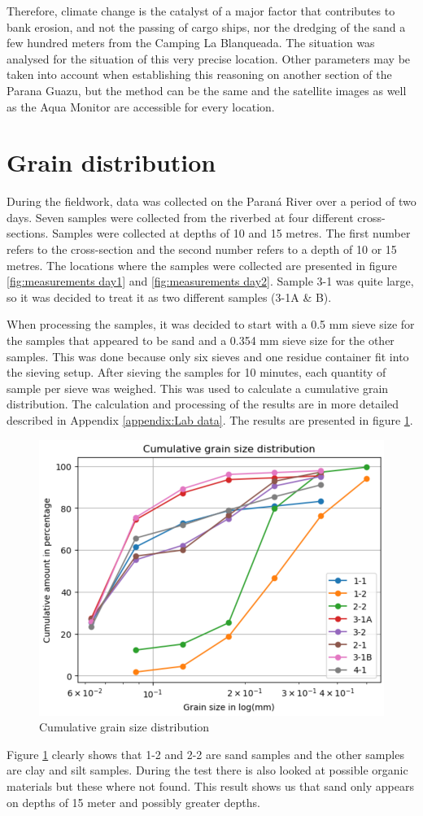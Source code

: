 Therefore, climate change is the catalyst of a major factor that contributes to bank erosion, and not the passing of cargo ships, nor the dredging of the sand a few hundred meters from the Camping La Blanqueada.
The situation was analysed for the situation of this very precise location. Other parameters may be taken into account when establishing this reasoning on another section of the Parana Guazu, but the method can be the same and the satellite images as well as the Aqua Monitor are accessible for every location. 

\section{Grain distribution}
During the fieldwork, data was collected on the Paraná River over a period of two days. Seven samples were collected from the riverbed at four different cross-sections. Samples were collected at depths of 10 and 15 metres. The first number refers to the cross-section and the second number refers to a depth of 10 or 15 metres. The locations where the samples were collected are presented in figure \ref{fig:measurements day1} and \ref{fig:measurements day2}. Sample 3-1 was quite large, so it was decided to treat it as two different samples (3-1A \& B). 

When processing the samples, it was decided to start with a 0.5 mm sieve size for the samples that appeared to be sand and a 0.354 mm sieve size for the other samples. This was done because only six sieves and one residue container fit into the sieving setup. After sieving the samples for 10 minutes, each quantity of sample per sieve was weighed. This was used to calculate a cumulative grain distribution. The calculation and processing of the results are in more detailed described in Appendix \ref{appendix:Lab data}. The results are presented in figure \ref{fig:Cumu}.

\begin{figure}[H]
    \centering
    \includegraphics[width=0.75\linewidth]{figures//ch6/cumu.png}
    \caption{Cumulative grain size distribution}
    \label{fig:Cumu}
\end{figure}

Figure \ref{fig:Cumu} clearly shows that 1-2 and 2-2 are sand samples and the other samples are clay and silt samples. During the test there is also looked at possible organic materials but these where not found. This result shows us that sand only appears on depths of 15 meter and possibly greater depths. 